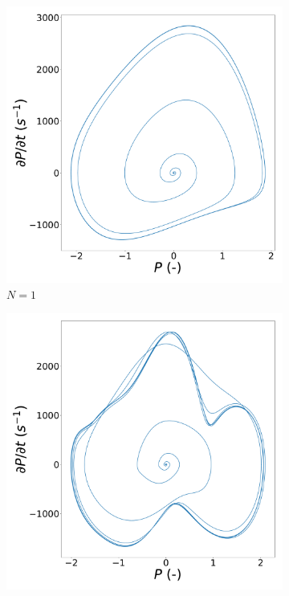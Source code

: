 \begin{figure}
    \centering
    \begin{subfigure}[b]{.24\linewidth}
        \includegraphics[width=\linewidth]{img/phase_diagram_N1.pdf}
        \caption{$N=1$}
        \label{fig:VDP_phase_N1}
    \end{subfigure}
    \hfill
    \begin{subfigure}[b]{.24\linewidth}
        \includegraphics[width=\linewidth]{img/phase_diagram_N2.pdf}

\end{subfigure}
\end{figure}
